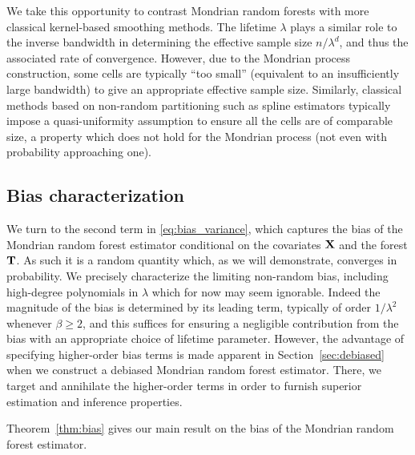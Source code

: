 We take this opportunity to contrast Mondrian random forests with
more classical kernel-based smoothing methods.
The lifetime $\lambda$ plays a similar role to the inverse bandwidth
in determining the effective sample size $n / \lambda^d$, and thus the
associated rate of convergence.
However, due to the Mondrian process
construction, some cells are typically ``too small''
(equivalent to an insufficiently large bandwidth)
to give an appropriate effective sample size.
Similarly, classical methods based on non-random partitioning
such as spline estimators
\citep{huang2003local,cattaneo2020large}
typically impose a quasi-uniformity assumption to ensure
all the cells are of comparable size,
a property which does not hold
for the Mondrian process (not even with probability approaching one).

\subsection*{Bias characterization}

We turn to the second term in \eqref{eq:bias_variance},
which captures the bias of the Mondrian random forest
estimator conditional on the covariates $\mathbf{X}$ and the forest $\mathbf{T}$.
As such it is a random quantity which,
as we will demonstrate, converges in probability.
We precisely characterize the limiting non-random bias,
including high-degree polynomials in $\lambda$ which for now
may seem ignorable.
Indeed the magnitude of the bias is determined by its leading term,
typically of order $1/\lambda^2$ whenever $\beta \geq 2$,
and this suffices for ensuring a negligible contribution from the bias
with an appropriate choice of lifetime parameter.
However, the advantage of specifying higher-order bias terms
is made apparent in Section~\ref{sec:debiased} when we construct
a debiased Mondrian random forest estimator.
There, we target and annihilate the higher-order terms in order
to furnish superior estimation and inference properties.

Theorem~\ref{thm:bias} gives our main result on
the bias of the Mondrian random forest estimator.

